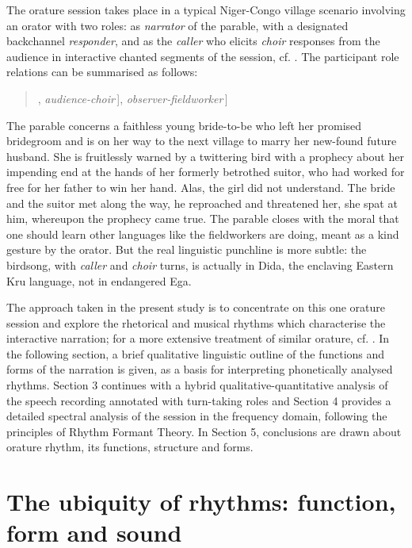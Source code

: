 \documentclass[output=paper,colorlinks,citecolor=brown]{langscibook}
\begin{document}
The orature session takes place in a typical Niger-Congo village scenario involving an orator with two roles: as \textit{narrator} of the parable, with a designated backchannel \textit{responder}, and as the \textit{caller} who elicits \textit{choir} responses from the audience in interactive chanted segments of the session, cf. . The participant role relations can be summarised as follows:
\begin{quotation}
\centering
[\,[\,[\textit{narrator-caller}, \textit{responder}\,], \textit{audience-choir}\,], \textit{observer-fieldworker}\,]
\end{quotation}
The parable concerns a faithless young bride-to-be who left her promised bridegroom and is on her way to the next village to marry her new-found future husband. She is fruitlessly warned by a twittering bird with a prophecy about her impending end at the hands of her formerly betrothed suitor, who had worked for free for her father to win her hand. Alas, the girl did not understand. The bride and the suitor met along the way, he reproached and threatened her, she spat at him, whereupon the prophecy came true. The parable closes with the moral that one should learn other languages like the fieldworkers are doing, meant as a kind gesture by the orator. But the real linguistic punchline is more subtle: the birdsong, with \textit{caller} and \textit{choir} turns, is actually in Dida, the enclaving Eastern Kru language, not in endangered Ega.

The approach taken in the present study is to concentrate on this one orature session and explore the rhetorical and musical rhythms which characterise the interactive narration; for a more extensive treatment of similar orature, cf. . In the following section, a brief qualitative linguistic outline of the functions and forms of the narration is given, as a basis for interpreting phonetically analysed rhythms. Section 3 continues with a hybrid qualitative-quantitative analysis of the speech recording annotated with turn-taking roles and Section 4 provides a detailed spectral analysis of the session in the frequency domain, following the principles of Rhythm Formant Theory. In Section 5, conclusions are drawn about orature rhythm, its functions, structure and forms.


\section{The ubiquity of rhythms: function, form and sound}
\end{document}
